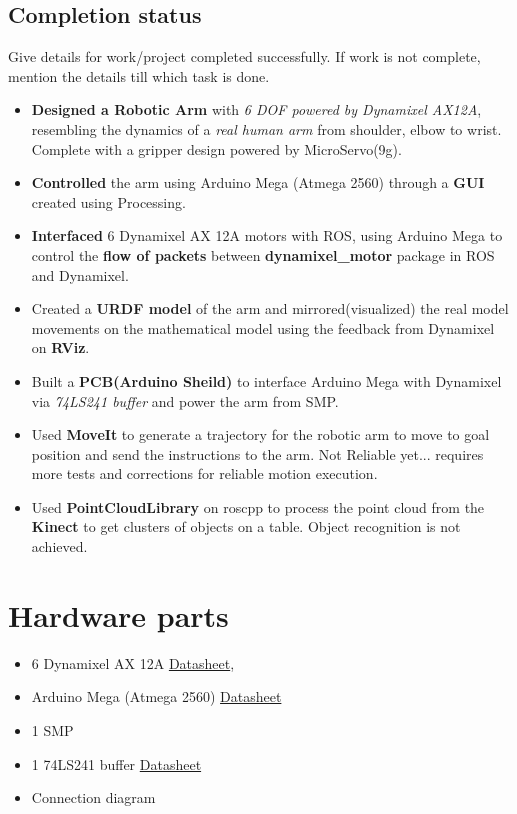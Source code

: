 \documentclass[a4paper,12pt,oneside]{book}
\begin{document}
	\subsection*{Completion status}
	Give details for work/project completed successfully. If work is not
	complete, mention the details till which task is done.
	\begin{itemize}
		\item \textbf{Designed a Robotic Arm} with \textit{6 DOF powered by Dynamixel AX12A}, resembling the dynamics of a \textit{real human arm} from shoulder, elbow to wrist. Complete with a gripper design powered by MicroServo(9g).
		\item \textbf{Controlled} the arm using Arduino Mega (Atmega 2560) through a \textbf{GUI} created using Processing.
		\item \textbf{Interfaced} 6 Dynamixel AX 12A motors with ROS, using Arduino Mega to control the \textbf{flow of packets} between \textbf{dynamixel\_motor} package in ROS and Dynamixel.
		\item Created a \textbf{URDF model} of the arm and mirrored(visualized) the real model movements on the mathematical model using the feedback from Dynamixel on \textbf{RViz}.
		\item Built a \textbf{PCB(Arduino Sheild)} to interface Arduino Mega with Dynamixel via \textit{74LS241 buffer} and power the arm from SMP.
		\item Used \textbf{MoveIt} to generate a trajectory for the robotic arm to move to goal position and send the instructions to the arm.
		\newline
		Not Reliable yet... requires more tests and corrections for reliable motion execution.
		\item Used \textbf{PointCloudLibrary} on roscpp to process the point cloud from the \textbf{Kinect} to get clusters of objects on a table.
		\newline
		Object recognition is not achieved.
	\end{itemize}
	\section{Hardware parts}
	\begin{itemize}
		\item 6 Dynamixel AX 12A 
		\href{http://www.trossenrobotics.com/images/productdownloads/AX-12(English).pdf}{Datasheet},
		\item Arduino Mega (Atmega 2560)
		\href{https://www.arduino.cc/en/uploads/Main/arduino-mega2560_R3-sch.pdf}{Datasheet}
		\item 1 SMP
		\item 1 74LS241 buffer 
		\href{https://www.arduino.cc}{Datasheet}
		\item Connection diagram
	\end{itemize}
	
\end{document}
